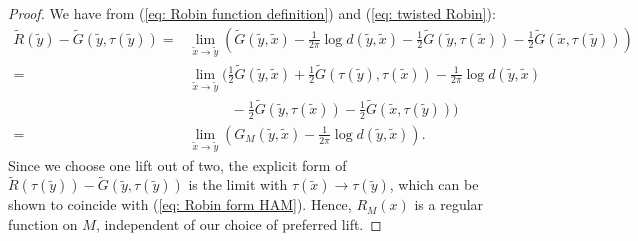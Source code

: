 \documentclass[10pt,a4paper]{amsart}
\def\Gt{\widetilde{G}}
\def\Rt{\widetilde{R}}
\def\xt{\tilde{x}}
\def\yt{\tilde{y}}
\begin{document}
\begin{proof}
We have from (\ref{eq: Robin function definition}) and (\ref{eq: twisted Robin}):
\begin{equation}
\label{eq: Robin form HAM}
    \begin{split}
        \Rt(\yt)- \Gt(\yt,\tau(\yt)) 
        =& \lim_{\xt\to \yt}\left(\Gt(\yt,\xt) -\frac{1}{2\pi}\log d(\yt,\xt)  - \frac12\Gt(\yt, \tau(\xt))  - \frac12\Gt(\xt,\tau(\yt))\right)  \\ =&\lim_{\xt\to \yt}\biggl(\frac12\Gt(\yt,\xt) + \frac12\Gt(\tau(\yt),\tau(\xt))-\frac{1}{2\pi}\log d(\yt,\xt)  \\& \qquad\quad -\frac12\Gt(\yt, \tau(\xt))  - \frac12\Gt(\xt,\tau(\yt))\biggr)  \\ =&\lim_{\xt\to \yt}\left(G_M(\yt,\xt) -\frac{1}{2\pi}\log d(\yt,\xt) \right).
    \end{split}
\end{equation}
Since we choose one lift out of two, the 
explicit form of $\Rt(\tau(\yt)) - \Gt(\yt,\tau(\yt))$  is the limit with $\tau(\xt)\to\tau(\yt)$, which can be shown to coincide with (\ref{eq: Robin form HAM}). Hence, $R_M(x)$ is a regular function on $M$, independent of our choice of preferred lift.
\end{proof}
\end{document}
